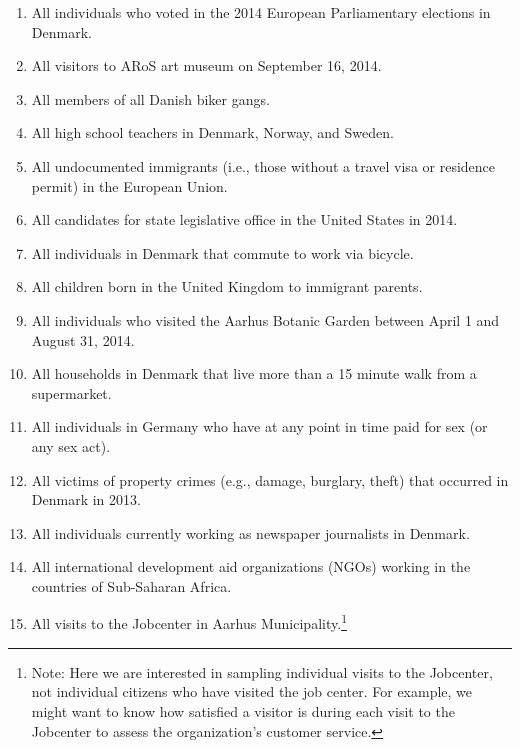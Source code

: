 \documentclass[a4, 12pt]{article}
\begin{document}
\begin{enumerate}\itemsep2em

\item All individuals who voted in the 2014 European Parliamentary elections in Denmark.

\item All visitors to ARoS art museum on September 16, 2014.

\item All members of all Danish biker gangs.

\item All high school teachers in Denmark, Norway, and Sweden.

\item All undocumented immigrants (i.e., those without a travel visa or residence permit) in the European Union.

\item All candidates for state legislative office in the United States in 2014.

\item All individuals in Denmark that commute to work via bicycle.

\item All children born in the United Kingdom to immigrant parents.

\item All individuals who visited the Aarhus Botanic Garden between April 1 and August 31, 2014.

\item All households in Denmark that live more than a 15 minute walk from a supermarket.

\item All individuals in Germany who have at any point in time paid for sex (or any sex act).

\item All victims of property crimes (e.g., damage, burglary, theft) that occurred in Denmark in 2013.

\item All individuals currently working as newspaper journalists in Denmark.

\item All international development aid organizations (NGOs) working in the countries of Sub-Saharan Africa.

\item All visits to the Jobcenter in Aarhus Municipality.\footnote{Note: Here we are interested in sampling individual visits to the Jobcenter, not individual citizens who have visited the job center. For example, we might want to know how satisfied a visitor is during each visit to the Jobcenter to assess the organization's customer service.}


\end{enumerate}
\end{document}
